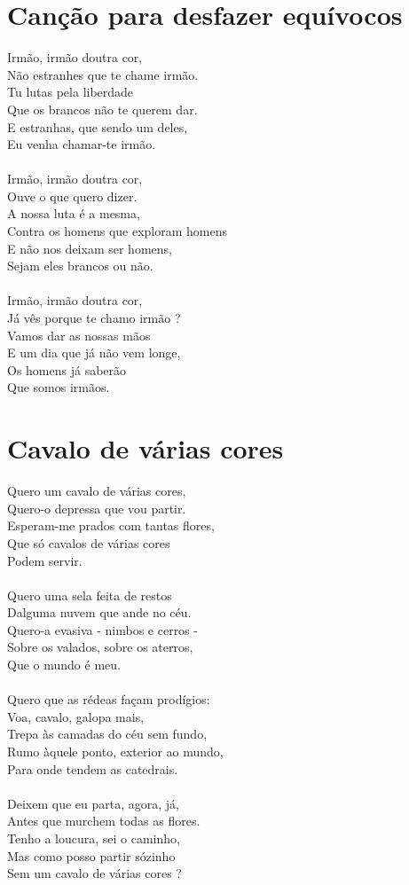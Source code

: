 \documentclass{article}
\begin{document}
\section{ Canção para desfazer equívocos}
Irmão, irmão doutra cor,\\
Não estranhes que te chame irmão.\\
Tu lutas pela liberdade\\
Que os brancos não te querem dar.\\
E estranhas, que sendo um deles,\\
Eu venha chamar-te irmão.\\
\\
Irmão, irmão doutra cor,\\
Ouve o que quero dizer.\\
A nossa luta é a mesma,\\
Contra os homens que exploram homens\\
E não nos deixam ser homens,\\
Sejam eles brancos ou não.\\
\\
Irmão, irmão doutra cor,\\
Já vês porque te chamo irmão ?\\
Vamos dar as nossas mãos\\
E um dia que já não vem longe,\\
Os homens já saberão\\
Que somos irmãos.\\
\section{ Cavalo de várias cores}
Quero um cavalo de várias cores,\\
Quero-o depressa que vou partir.\\
Esperam-me prados com tantas flores,\\
Que só cavalos de várias cores\\
Podem servir.\\
\\
Quero uma sela feita de restos\\
Dalguma nuvem que ande no céu.\\
Quero-a evasiva - nimbos e cerros -\\
Sobre os valados, sobre os aterros,\\
Que o mundo é meu.\\
\\
Quero que as rédeas façam prodígios:\\
Voa, cavalo, galopa mais,\\
Trepa às camadas do céu sem fundo,\\
Rumo àquele ponto, exterior ao mundo,\\
Para onde tendem as catedrais.\\
\\
Deixem que eu parta, agora, já,\\
Antes que murchem todas as flores.\\
Tenho a loucura, sei o caminho,\\
Mas como posso partir sózinho\\
Sem um cavalo de várias cores ?\\
\end{document}

